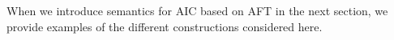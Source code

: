 
When we introduce semantics for AIC based on AFT in the next section, we provide examples of the different constructions considered here. 

